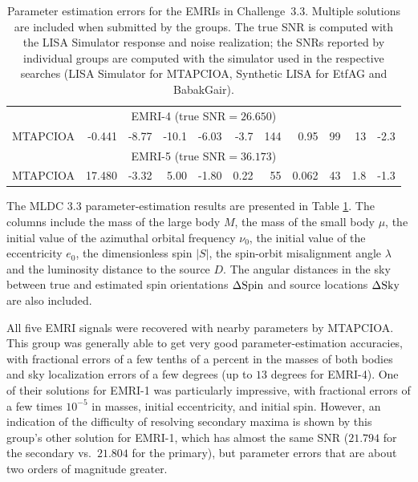 \documentclass{iopart}
\begin{document}
\begin{table}
\begin{center}
\begin{tabular}{|l|rrrrrrrrrr|}
\multicolumn{11}{|c|}{EMRI-4 (true SNR$=26.650$)} \\
MTAPCIOA & -0.441 & -8.77  &  -10.1  &  -6.03  &  -3.7 &  144  &  0.95  &  99  &  13  &  -2.3  \\ %
\hline

\multicolumn{11}{|c|}{EMRI-5 (true SNR$=36.173$)} \\
MTAPCIOA  & 17.480  &  -3.32  &  5.00  &  -1.80  &  0.22  &  55  &  0.062  &  43  &  1.8  &  -1.3  \\ %
\hline                                              

\end{tabular}
\end{center}
\caption{Parameter estimation errors for the EMRIs in Challenge~3.3. Multiple solutions are included when submitted by the groups.
The true SNR is computed with the LISA Simulator response and noise realization; the SNRs reported by individual groups are computed with the simulator used in the respective searches (LISA Simulator for MTAPCIOA, Synthetic LISA for EtfAG and BabakGair).
\label{tab:EMRI_Err}}
\end{table} 

The MLDC 3.3 parameter-estimation results are presented in Table \ref{tab:EMRI_Err}.  The columns include the mass of the large body $M$, the mass of the small body $\mu$, the initial value of the azimuthal orbital frequency $\nu_0$, the initial value of the eccentricity $e_0$, the dimensionless spin $|S|$, the spin-orbit misalignment angle $\lambda$ and the luminosity distance to the source $D$.  The angular distances in the sky between true and estimated spin orientations $\Delta {\rm Spin}$ and source locations $\Delta {\rm Sky}$ are also included.

All five EMRI signals were recovered with nearby parameters by MTAPCIOA.  This group was generally able to get very good parameter-estimation accuracies, with fractional errors of a few tenths of a percent in the masses of both bodies and sky localization errors of a few degrees (up to $13$ degrees for EMRI-4).  One of their solutions for EMRI-1 was particularly impressive, with fractional errors of a few times $10^{-5}$ in masses, initial eccentricity, and initial spin.  However, an indication of the difficulty of resolving secondary maxima is shown by this group's other solution for EMRI-1, which has almost the same SNR ($21.794$ for the secondary vs.~$21.804$ for the primary), but parameter errors that are about two orders of magnitude greater.  
\end{document}
